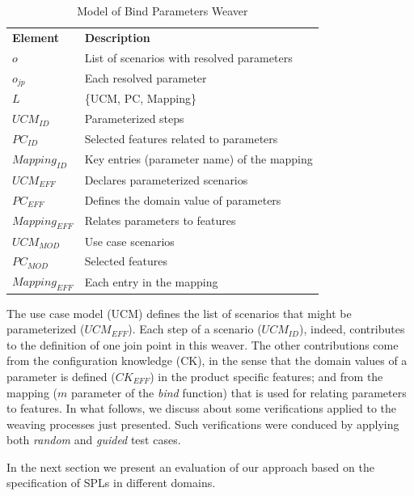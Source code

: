 \documentclass{acm_proc_article-sp}
\begin{document}
\begin{table}[th]
\begin{center}
\caption{Model of Bind Parameters Weaver} \label{tab:bp-weaver}
\begin{tabular}{p{0.7in}p{2.3in}}
   \hline\noalign{\smallskip}
  {\bf Element} & {\bf Description} \\
   \noalign{\smallskip}
   \hline
   \noalign{\smallskip}
   $o$               & List of scenarios with resolved parameters  \\
   $o_{jp}$        & Each resolved parameter \\
   $L$               & \{UCM, PC, Mapping\} \\
   $UCM_{ID}$ & Parameterized steps \\
   $PC_{ID}$    & Selected features related to parameters \\
   $Mapping_{ID}$ & Key entries (parameter name) of the mapping\\
   $UCM_{EFF}$ & Declares parameterized scenarios \\
   $PC_{EFF}$    & Defines the domain value of parameters \\
   $Mapping_{EFF}$ & Relates parameters to features \\
   $UCM_{MOD}$ & Use case scenarios \\
   $PC_{MOD}$    & Selected features \\
   $Mapping_{EFF}$ & Each entry in the mapping \\
  \hline
  \end{tabular}
\end{center}
\end{table}

The use case model (UCM) defines the list of scenarios that might be parameterized ($UCM_{EFF}$). Each step of a scenario ($UCM_{ID}$), indeed, contributes to the definition of one join point in this weaver. The
other contributions come from the configuration knowledge (CK), in the sense that the domain values
of a parameter is defined ($CK_{EFF}$) in the product specific features; and from the mapping ($m$ parameter of the \emph{bind} function) that is used for relating parameters to features.
In what follows, we discuss about some verifications applied to the weaving processes just presented. Such verifications were conduced by applying both \emph{random} and \emph{guided} test cases.

In the next section we present an evaluation of our approach based on the
specification of SPLs in different domains.
\end{document}
